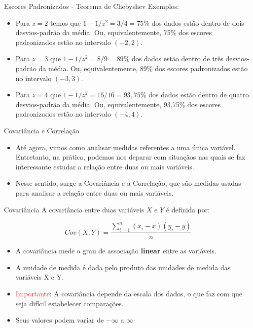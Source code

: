 \begin{frame}{Escores Padronizados - Teorema de Chebyshev}
    Exemplos:
    \begin{itemize}
        \item Para $z=2$ temos que $1-1/z^2 = 3/4 = 75\%$ dos dados estão dentro de dois desvios-padrão da média. Ou, equivalentemente, 
        75\% dos escores padronizados estão no intervalo $(-2,2)$. 
        \pause
        \item Para $z=3$  que $1-1/z^2 = 8/9 = 89\%$ dos dados estão dentro de três desvios-padrão da média. Ou, equivalentemente, 
        89\% dos escores padronizados estão no intervalo $(-3,3)$. 
        \pause
        \item Para $z=4$  que $1-1/z^2 = 15/16 = 93,75\%$ dos dados estão dentro de quatro desvios-padrão da média. Ou, equivalentemente, 
        93,75\% dos escores padronizados estão no intervalo $(-4,4)$. 
    \end{itemize}
\end{frame}

\begin{frame}{Covariância e Correlação}
    \begin{itemize}
        \item  Até agora, vimos como analisar medidas referentes a uma única variável. Entretanto, na prática, 
        podemos nos deparar com situaçãos nas quais se faz interessante estudar a relação entre duas ou mais
        variáveis. 
        \pause
        \item    Nesse sentido, surge a Covariância e a Correlação, que são medidas usadas para analisar a relação entre duas ou mais variáveis.  
    \end{itemize}
\end{frame}

\begin{frame}{Covariância}
    A covariância entre duas variáveis $X$ e $Y$ é definida por:

    $$Cov(X,Y) = \dfrac{\sum_{i=1}^n (x_i - \bar{x})(y_i - \bar{y}) }{n}$$

    \pause

    \begin{itemize}
        \item A covariância mede o grau de associação \textbf{linear} entre as variáveis.
        \pause
        \item A unidade de medida é dada pelo produto das unidades de medida das variáveis X e Y.
        \pause
        \item  \textcolor{red}{Importante}: A covariância depende da escala dos dados, o que faz com que seja difícil estabelecer comparações. 
        \pause
        \item  Seus valores podem variar de $-\infty$ a $\infty$
    \end{itemize}
\end{frame}


